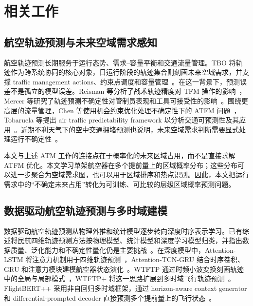 \section{相关工作}

\subsection{航空轨迹预测与未来空域需求感知}

航空轨迹预测长期服务于运行态势、需求--容量平衡和交通流量管理。TBO 将轨迹作为跨系统协同的核心对象，日运行阶段的轨迹集合则刻画未来空域需求，并支撑 traffic management actions、约束点调度和容量管理~\cite{faa_tbo_2026,icao_ganp_2026}。在这一背景下，预测误差不是孤立的模型误差。Reisman 等分析了战术轨迹精度对 TFM 操作的影响~\cite{reisman2007trajectory_accuracy_tfm}，Mercer 等研究了轨迹预测不确定性对管制员表现和工具可接受性的影响~\cite{mercer2013trajectory_uncertainty}。围绕更高层的流量管理，Chen 等使用机会约束优化处理不确定性下的 ATFM 问题~\cite{chen2017atfm_uncertainty}，Tobaruela 等提出 air traffic predictability framework 以分析交通可预测性及其应用~\cite{tobaruela2014predictability}。近期不利天气下的空中交通拥堵预测也说明，未来空域需求判断需要显式处理运行不确定性~\cite{nunezportillo2024congestion_weather}。

本文与上述 ATM 工作的连接点在于概率化的未来区域占用，而不是直接求解 ATFM 优化。本文学习单架航空器在多个提前量上的区域概率分布；这些分布可以进一步聚合为空域需求图，也可以用于区域排序和热点识别。因此，本文把运行需求中的“不确定未来占用”转化为可训练、可比较的层级区域概率预测问题。

\subsection{数据驱动航空轨迹预测与多时域建模}

数据驱动航空轨迹预测从物理外推和统计模型逐步转向深度时序表示学习。已有综述将民航四维轨迹预测方法按物理模型、统计模型和深度学习模型归类，并指出数据质量、泛化能力和不确定性量化仍是主要挑战~\cite{zeng2022trajectory_review,kwak2025trajectory_review}。在深度模型中，Attention-LSTM 将注意力机制用于四维轨迹预测~\cite{jia2022attentionlstm}，Attention-TCN-GRU 结合时序卷积、GRU 和注意力模块建模航空器状态演化~\cite{ma2024attentiontcngru}。WTFTP 通过时频小波变换刻画轨迹中的全局与局部模式~\cite{zhang2023wtftp}，WTFTP+ 将这一思路扩展到多时域飞行轨迹预测~\cite{guo2026wtftpplus}。FlightBERT++ 采用非自回归多时域框架，通过 horizon-aware context generator 和 differential-prompted decoder 直接预测多个提前量上的飞行状态~\cite{guo_flightbertpp_2024}。

